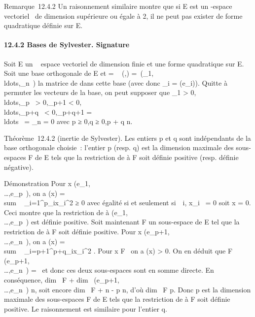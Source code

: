 \documentclass[]{article}
\begin{document}
Remarque~12.4.2 Un raisonnement similaire montre que si E est un
-espace vectoriel ~de dimension supérieure ou égale à 2, il ne peut pas
exister de forme quadratique définie sur E.

\paragraph{12.4.2 Bases de Sylvester. Signature}

Soit E un ~ espace vectoriel de dimension finie et \Phi une forme
quadratique sur E. Soit  une base orthogonale de E et \Omega
= \mathrmMat~ (\Phi,)
=\
\mathrmdiag(\alpha_1,\\ldots,\alpha_n~)
la matrice de \Phi dans cette base (avec donc \alpha_i =
\Phi(e_i)). Quitte à permuter les vecteurs de la base, on peut
supposer que \alpha_1 \textgreater{}
0,\\ldots,\alpha_p~
\textgreater{} 0,\alpha_p+1 \textless{}
0,\\ldots,\alpha_p+q~
\textless{} 0,\alpha_p+q+1 =
\\ldots~ =
\alpha_n = 0 avec p ≥ 0,q ≥ 0,p + q \leq n.

Théorème~12.4.2 (inertie de Sylvester). Les entiers p et q sont
indépendants de la base orthogonale choisie~: l'entier p (resp. q) est
la dimension maximale des sous-espaces F de E tels que la restriction de
\Phi à F soit définie positive (resp. définie négative).

Démonstration Pour x
\in\mathrmVect(e_1,\\\ldots,e_p~),
on a \Phi(x) = \\sum ~
_i=1^p\alpha_ix_i^2 ≥ 0 avec égalité
si et seulement si~\forall~i, x_i~ = 0 soit x
= 0. Ceci montre que la restriction de \Phi à
\mathrmVect(e_1,\\\ldots,e_p~)
est définie positive. Soit maintenant F un sous-espace de E tel que la
restriction de \Phi à F soit définie positive. Pour x
\in\mathrmVect(e_p+1,\\\ldots,e_n~),
on a \Phi(x) = \\sum ~
_i=p+1^p+q\alpha_ix_i^2 . Pour x \in
F \diagdown\0\ on a \Phi(x) \textgreater{} 0. On
en déduit que F
\bigcap\mathrmVect(e_p+1,\\\ldots,e_n~)
= \0\ et donc ces deux sous-espaces
sont en somme directe. En conséquence, dim~ F
+ dim~
\mathrmVect(e_p+1,\\\ldots,e_n~)
\leq n, soit encore dim~ F + n - p \leq n, d'où
dim~ F \leq p. Donc p est la dimension maximale
des sous-espaces F de E tels que la restriction de \Phi à F soit définie
positive. Le raisonnement est similaire pour l'entier q.
\end{document}
